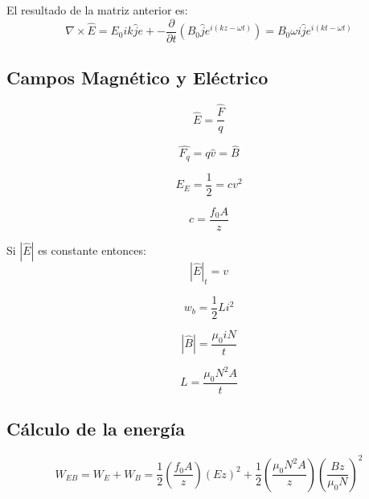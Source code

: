 \documentclass[]{article}
\begin{document}
El resultado de la matriz anterior es:\\

\begin{equation}
\nabla \times \hat{E}=E_0ik\hat{j}e+-\frac{\partial}{\partial t}(B_0\hat{j}e^{i(kz - \omega t)})=B_0 \omega i \hat{j} e^{i(kt-\omega t)}
\end{equation}

\subsection{Campos Magnético y Eléctrico}

\begin{equation}
\hat{E}=\frac{\hat{F}}{q}
\end{equation}

\begin{equation}
\hat{F_q}=q\hat{v}=\hat{B}
\end{equation}

\begin{equation}
E_E=\frac{1}{2}=cv^2
\end{equation}

\begin{equation}
c=\frac{f_0 A}{z}
\end{equation}

Si $|\hat{E}|$ es constante entonces:\\

\begin{equation}
|\hat{E}|_t=v
\end{equation}

\begin{equation}
w_b=\frac{1}{2}Li^2
\end{equation}

\begin{equation}
|\hat{B}|=\frac{\mu_0 i N}{t}
\end{equation}


\begin{equation}
L=\frac{\mu_0 N^2 A}{t}
\end{equation}

\subsection{Cálculo de la energía}

\begin{equation}
W_{EB}=W_E+W_B=\frac{1}{2}(\frac{f_0 A}{z})(Ez)^2+\frac{1}{2}(\frac{\mu_0 N^2 A}{z})(\frac{B z}{\mu_0 N})^2
\end{equation}
\end{document}
